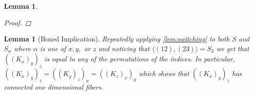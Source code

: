 \documentclass{article}
\newcommand{\sxyz}{((K_x)_y)_z}
\newcommand{\Sxyz}[3]{((K_#1)_#2)_#3}
\theoremstyle{mystyle}
\newtheorem{lem}[thm]{Lemma}
\theoremstyle{remark}
\begin{document}
\begin{lem}
\begin{proof}
    \end{proof}

\end{lem}

\begin{lem}
    [Boxed Implication]
 \label{lem:boximp} 
    Repeatedly applying \ref{lem:switching} to both \(S\) and \(S_{\alpha}\) where \(\alpha\) is one of \(x,y,\) or \(z\)  and noticing that \(\langle (12),(23) \rangle = S_{3}\) we get that \(\sxyz\) is equal to any of the permutations of the indices. In particular, \(\Sxyz{x}{y}{z}=\Sxyz{y}{z}{x}=\Sxyz{z}{x}{y}\) which shows that \(\sxyz\) has connected one dimensional fibers.
\end{lem}
\end{document}
